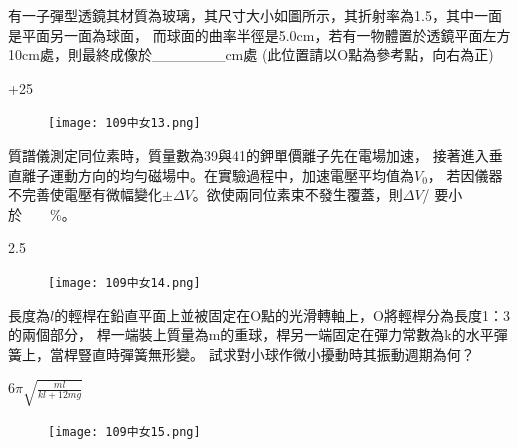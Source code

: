 \documentclass[cn,10pt,math=newtx]{elegantbook}
\begin{document}
\begin{example}
  有一子彈型透鏡其材質為玻璃，其尺寸大小如圖所示，其折射率為1.5，其中一面是平面另一面為球面，
  而球面的曲率半徑是5.0cm，若有一物體置於透鏡平面左方10cm處，則最終成像於\_\_\_\_\_\_\_cm處
  (此位置請以O點為參考點，向右為正)\\
  \rightline{[台中女中教甄109]} 
\end{example}
\begin{solution}
  +25
\end{solution}
\begin{figure}[htbp]
  \flushright
  \texttt{[image: 109中女13.png]}
\end{figure}
\newpage

\begin{example}
  質譜儀測定同位素時，質量數為39與41的鉀單價離子先在電場加速，
  接著進入垂直離子運動方向的均勻磁場中。在實驗過程中，加速電壓平均值為$V_0$，
  若因儀器不完善使電壓有微幅變化$\pm \Delta V$。欲使兩同位素束不發生覆蓋，則$\Delta V$/ 要小於\ \ \ \  \%。\\
  \rightline{[台中女中教甄109]} 
\end{example}
\begin{solution}
  2.5
\end{solution}
\begin{figure}[htbp]
  \flushright
  \texttt{[image: 109中女14.png]}
\end{figure}
\newpage
\begin{example}
  長度為$l$的輕桿在鉛直平面上並被固定在O點的光滑轉軸上，O將輕桿分為長度1：3的兩個部分，
  桿一端裝上質量為m的重球，桿另一端固定在彈力常數為k的水平彈簧上，當桿豎直時彈簧無形變。
  試求對小球作微小擾動時其振動週期為何？\\
  \rightline{[台中女中教甄109]} 
\end{example}
\begin{solution}
  $6\pi \sqrt{\frac{ml}{kl+12mg}}$
\end{solution}
\begin{figure}[htbp]
  \flushright
  \texttt{[image: 109中女15.png]}
\end{figure}
\newpage
\end{document}
